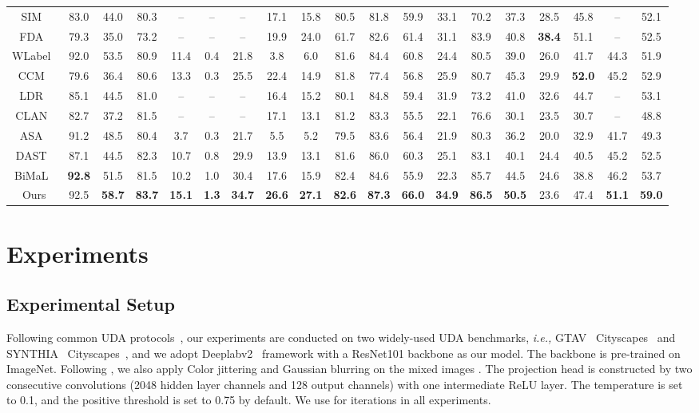 \documentclass{article}
\begin{document}
\begin{table*}[t]
{\begin{tabular}{c|cccccccccccccccc|c|c}
SIM~\cite{SIM}& 83.0 &44.0 &80.3 &-- &-- &-- & 17.1 &15.8 &80.5 &81.8 &59.9 &33.1 &70.2 &37.3 &28.5 &45.8  & -- &52.1 \\
FDA~\cite{FDA}& 79.3 &35.0 &73.2 &-- &-- &-- &19.9 &24.0 &61.7 &82.6 &61.4 &31.1 &83.9 &40.8 &\textbf{38.4} &51.1  & -- &52.5\\
WLabel~\cite{WLabel}&92.0 &53.5 &80.9 &11.4 &0.4 &21.8 &3.8 &6.0 &81.6 &84.4 &60.8 &24.4 &80.5 &39.0 &26.0 &41.7  &44.3 &51.9 \\
CCM~\cite{CCM}&79.6 &36.4 &80.6 &13.3 &0.3 &25.5 &22.4 &14.9 &81.8 &77.4 &56.8 &25.9 &80.7 &45.3 &29.9 &\textbf{52.0}  & 45.2 &52.9 \\
LDR~\cite{LDR}&85.1 &44.5 &81.0 &-- &-- &-- &16.4 &15.2 &80.1 &84.8 &59.4 &31.9 &73.2 &41.0 &32.6 &44.7 & -- &53.1 \\
CLAN~\cite{CLANv2} &82.7 &37.2 &81.5 &-- &-- &-- &17.1 &13.1 &81.2 &83.3 &55.5 &22.1 &76.6 &30.1 &23.5 &30.7 & -- &48.8\\
ASA~\cite{ASA} &91.2 &48.5 &80.4 &3.7 &0.3 &21.7 &5.5 &5.2 &79.5 &83.6 &56.4 &21.9 &80.3 &36.2 &20.0 &32.9 & 41.7 &49.3\\
DAST~\cite{DAST}&87.1 &44.5 &82.3 &10.7 &0.8 &29.9 &13.9 &13.1 &81.6 &86.0 &60.3 &25.1 &83.1 &40.1 &24.4 &40.5 & 45.2 &52.5\\
BiMaL~\cite{truong2021bimal} & \textbf{92.8} & 51.5 & 81.5 &10.2 &1.0 &30.4  & 17.6 & 15.9 & 82.4 & 84.6 & 55.9 & 22.3 & 85.7 & 44.5 & 24.6 & 38.8 & 46.2 &53.7 \\
\midrule
Ours &92.5 &\textbf{58.7} &\textbf{83.7} &\textbf{15.1} &\textbf{1.3} &\textbf{34.7}  &\textbf{26.6} &\textbf{27.1} &\textbf{82.6} &\textbf{87.3} &\textbf{66.0
} &\textbf{34.9} &\textbf{86.5} &\textbf{50.5} &23.6 &47.4  & \textbf{51.1} &\textbf{59.0}\\
\bottomrule
\end{tabular}}
\end{table*}



\section{Experiments}

\subsection{Experimental Setup}
\label{sec:4.1}
Following common UDA protocols~\cite{AdaptSegNet,SIM,BDL}, our experiments are conducted on two widely-used UDA benchmarks,  \emph{i.e.,} GTAV~\cite{stephan2016gtav}  Cityscapes~\cite{cordts2016cityscapes} and SYNTHIA~\cite{ros2016synthia}  Cityscapes~\cite{cordts2016cityscapes}, and we adopt Deeplabv2~\cite{chen2018deeplab} framework with a ResNet101 backbone as our model. The backbone is pre-trained on ImageNet. 
Following \cite{tranheden2020dacs}, we also apply Color jittering and Gaussian blurring on the mixed images . 
The projection head  is constructed by two consecutive convolutions (2048 hidden layer channels and 128 output channels) with one intermediate ReLU layer.  The temperature  is set to 0.1, and the positive threshold  is set to 0.75 by default. 
We use  for  iterations in all experiments. 
\end{document}
